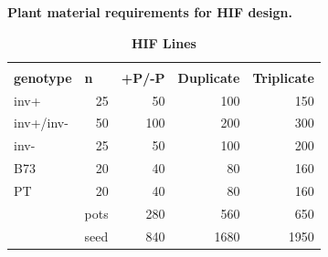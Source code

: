 \documentclass[10pt,letterpaper]{article}
\begin{document}
\begin{table}[!h]
\caption{\textbf{Plant material requirements for HIF design.}}


\begin{subtable}{\textwidth}
\centering
\begin{tabular}{lrrrr}
                  & \multicolumn{1}{l}{}           & \multicolumn{1}{l}{}               & \multicolumn{1}{l}{}                   & \multicolumn{1}{l}{}                     \\
\textbf{genotype} & \multicolumn{1}{l}{\textbf{n}} & \multicolumn{1}{l}{\textbf{+P/-P}} & \multicolumn{1}{l}{\textbf{Duplicate}} & \multicolumn{1}{l}{\textbf{Triplicate}}  \\ 
\hline
inv+      & 25                       & 50                        & 100                           & 150                             \\
inv+/inv- & 50                       & 100                       & 200                           & 300                             \\
inv-      & 25                       & 50                        & 100                           & 200                             \\
B73       & 20                       & 40                        & 80                            & 160                             \\
PT        & 20                       & 40                        & 80                            & 160 \\
\cline{2-5}
          & \multicolumn{1}{l}{pots} & 280                       & 560                           & 650                             \\
          & \multicolumn{1}{l}{seed} & 840                       & 1680                          & 1950                                       
\end{tabular}
\caption{ \textbf{HIF Lines}}
\label{tab:table1_a}
\end{subtable}


\end{table}
\end{document}
